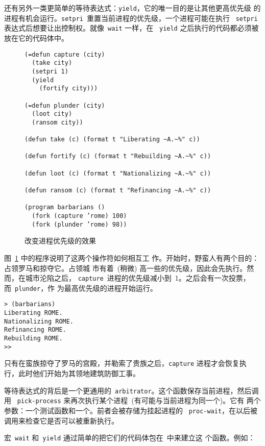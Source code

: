 还有另外一类更简单的等待表达式：\texttt{yield}，它的唯一目的是让其他更高优先级
的进程有机会运行。\texttt{setpri}~重置当前进程的优先级，一个进程可能在执行
~\texttt{setpri} 表达式后想要让出控制权。就像~\texttt{wait} 一样，在
~\texttt{yield} 之后执行的代码都必须被放在它的代码体中。

\begin{figure}
\begin{lstlisting}
(=defun capture (city)
  (take city)
  (setpri 1)
  (yield
    (fortify city)))

(=defun plunder (city)
  (loot city)
  (ransom city))

(defun take (c) (format t "Liberating ~A.~%" c))

(defun fortify (c) (format t "Rebuilding ~A.~%" c))

(defun loot (c) (format t "Nationalizing ~A.~%" c))

(defun ransom (c) (format t "Refinancing ~A.~%" c))

(program barbarians ()
  (fork (capture ’rome) 100)
  (fork (plunder ’rome) 98))
\end{lstlisting}
\caption{改变进程优先级的效果}
\label{fig:effect_of_changing_priorities}
\end{figure}

图~\ref{fig:effect_of_changing_priorities} 中的程序说明了这两个操作符如何相互工
作。开始时，野蛮人有两个目的：占领罗马和掠夺它。占领城
市有着~(稍微) 高一些的优先级，因此会先执行。然而，在城市沦陷之后，
\texttt{capture}~进程的优先级减小到~1。之后会有一次投票，而~\texttt{plunder}，作
为最高优先级的进程开始运行。
\begin{lstlisting}
> (barbarians)
Liberating ROME.
Nationalizing ROME.
Refinancing ROME.
Rebuilding ROME.
>>
\end{lstlisting}
只有在蛮族掠夺了罗马的宫殿，并勒索了贵族之后，\verb|capture| 进程才会恢复执
行，此时他们开始为其领地建筑防御工事。

等待表达式的背后是一个更通用的~\texttt{arbitrator}。这个函数保存当前进程，然后调用
~\texttt{pick-process} 来再次执行某个进程~(有可能与当前进程为同一个)。它有
两个参数：一个测试函数和一个\continuation{}。前者会被存储为挂起进程的
~\texttt{proc-wait}，在以后被调用来检查它是否可以被重新执行。

宏~\texttt{wait} 和~\texttt{yield} 通过简单的把它们的代码体包在~\lexpr{}中来建立这
个\continuation{}函数。例如：


